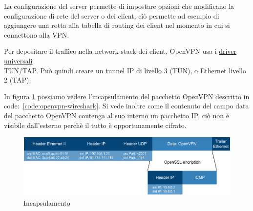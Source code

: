 La configurazione del server permette di impostare opzioni che modificano la configurazione di rete del server o dei client, ciò permette ad esempio di aggiungere una rotta alla tabella di routing dei client nel momento in cui si connettono alla VPN.

Per depositare il traffico nella network stack dei client, OpenVPN usa i \href{https://docs.kernel.org/networking/tuntap.html}{driver universali \\TUN/TAP}. Può quindi creare un tunnel IP di livello 3 (TUN), o Ethernet livello 2 (TAP).

\todo[da rivedere!]

In figura \ref{fig:incapsulamento-openvpn} possiamo vedere l'incapsulamento del pacchetto OpenVPN descritto in code:~\ref{code:openvpn-wireshark}. Si vede inoltre come il contenuto del campo data del pacchetto OpenVPN contenga al suo interno un pacchetto IP, ciò non è visibile dall'esterno perchè il tutto è opportunamente cifrato.

\begin{figure}[h]
    \centering
    \includegraphics[width=1\textwidth]{immagini/diag2-incapsulamento_openvpn}
    \caption{Incapsulamento}
    \label{fig:incapsulamento-openvpn}
\end{figure}

